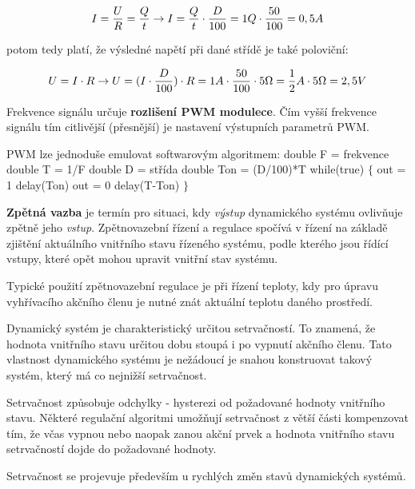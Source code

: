 $$I = {U\over R} = {Q\over t} \rightarrow I = {Q\over t}\cdot {D\over 100} = 1Q \cdot {50\over 100} = 0,5A$$

potom tedy platí, že výsledné napětí při dané střídě je také poloviční: 

$$U = {I\cdot R} \rightarrow U={(I\cdot {D\over 100})\cdot R} = 1A \cdot {50\over 100}\cdot 5\Omega = {1\over 2}A \cdot 5 \Omega = 2,5V$$

\vskip 4mm
\centerline{}
\vskip 4mm

Frekvence signálu určuje {\bf rozlišení PWM modulece}. Čím vyšší frekvence signálu tím citlivější (přesnější) je nastavení výstupních parametrů PWM.

PWM lze jednoduše emulovat softwarovým algoritmem:
\vskip 4mm
{
\verbatim
\odradkovat
\odradkovat double F = frekvence
\odradkovat double T = 1/F
\odradkovat double D = střída
\odradkovat double Ton = (D/100)*T
\odradkovat 
\odradkovat while(true)
\odradkovat $\{$ 
\odradkovat \hskip 4mm out = 1
\odradkovat \hskip 4mm delay(Ton)
\odradkovat \hskip 4mm out = 0
\odradkovat \hskip 4mm delay(T-Ton)
\odradkovat $\}$
}

\vskip 4mm



{\bf Zpětná vazba} je termín pro situaci, kdy {\it výstup} dynamického systému ovlivňuje zpětně jeho {\it vstup}. Zpětnovazební řízení a regulace spočívá v řízení na základě zjištění aktuálního vnitřního stavu řízeného systému, podle kterého jsou řídící vstupy, které opět mohou upravit vnitřní stav systému. 

Typické použití zpětnovazební regulace je při řízení teploty, kdy pro úpravu vyhřívacího akčního členu je nutné znát aktuální teplotu daného prostředí.

Dynamický systém je charakteristický určitou setrvačností. To znamená, že hodnota vnitřního stavu určitou dobu stoupá i po vypnutí akčního členu. Tato vlastnost dynamického systému je nežádoucí je snahou konstruovat takový systém, který má co nejnižší setrvačnost. 

Setrvačnost způsobuje odchylky - hysterezi od požadované hodnoty vnitřního stavu. Některé regulační algoritmi umožňují setrvačnost z větší části kompenzovat tím, že včas vypnou nebo naopak zanou akční prvek a hodnota vnitřního stavu setrvačností dojde do požadované hodnoty.  

Setrvačnost se projevuje především u rychlých změn stavů dynamických systémů.

